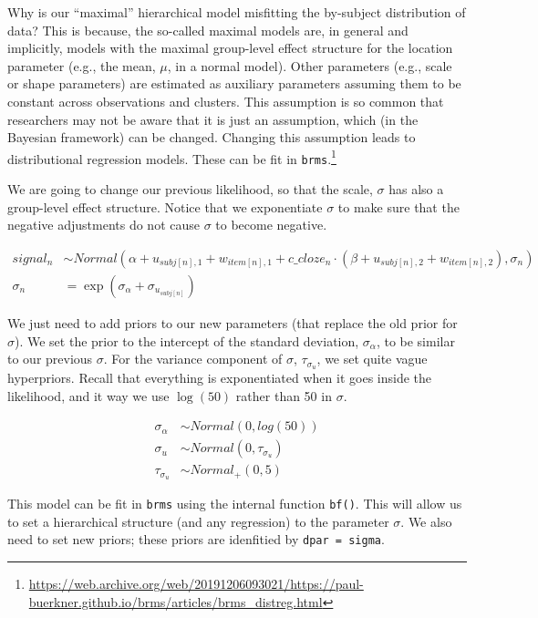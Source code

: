 \documentclass[12pt,]{krantz}
\theoremstyle{definition}
\theoremstyle{definition}
\theoremstyle{definition}
\theoremstyle{remark}
\begin{document}
Why is our ``maximal'' hierarchical model misfitting the by-subject
distribution of data? This is because, the so-called maximal models are,
in general and implicitly, models with the maximal group-level effect
structure for the location parameter (e.g., the mean, \(\mu\), in a
normal model). Other parameters (e.g., scale or shape parameters) are
estimated as auxiliary parameters assuming them to be constant across
observations and clusters. This assumption is so common that researchers
may not be aware that it is just an assumption, which (in the Bayesian
framework) can be changed. Changing this assumption leads to
distributional regression models. These can be fit in
\texttt{brms}.\footnote{\url{https://web.archive.org/web/20191206093021/https://paul-buerkner.github.io/brms/articles/brms_distreg.html}}

We are going to change our previous likelihood, so that the scale,
\(\sigma\) has also a group-level effect structure. Notice that we
exponentiate \(\sigma\) to make sure that the negative adjustments do
not cause \(\sigma\) to become negative.

\begin{equation}
\begin{aligned}
  signal_n &\sim Normal(\alpha + u_{subj[n],1} + w_{item[n],1} + c\_cloze_n \cdot  (\beta + u_{subj[n],2}+ w_{item[n],2}), \sigma_n)\\
  \sigma_n &= \exp(\sigma_\alpha + \sigma_{u_{subj[n]}})
\end{aligned}
\end{equation}

We just need to add priors to our new parameters (that replace the old
prior for \(\sigma\)). We set the prior to the intercept of the standard
deviation, \(\sigma_\alpha\), to be similar to our previous \(\sigma\).
For the variance component of \(\sigma\), \(\tau_{\sigma_u}\), we set
quite vague hyperpriors. Recall that everything is exponentiated when it
goes inside the likelihood, and it way we use \(\log(50)\) rather than
50 in \(\sigma\).

\begin{equation}
\begin{aligned}
  \sigma_\alpha &\sim Normal(0,log(50))\\
  \sigma_u &\sim Normal(0, \tau_{\sigma_u}) \\
  \tau_{\sigma_u} &\sim Normal_+(0, 5)
\end{aligned}
\end{equation}

This model can be fit in \texttt{brms} using the internal function
\texttt{bf()}. This will allow us to set a hierarchical structure (and
any regression) to the parameter \(\sigma\). We also need to set new
priors; these priors are idenfitied by \texttt{dpar\ =\ sigma}.
\end{document}
